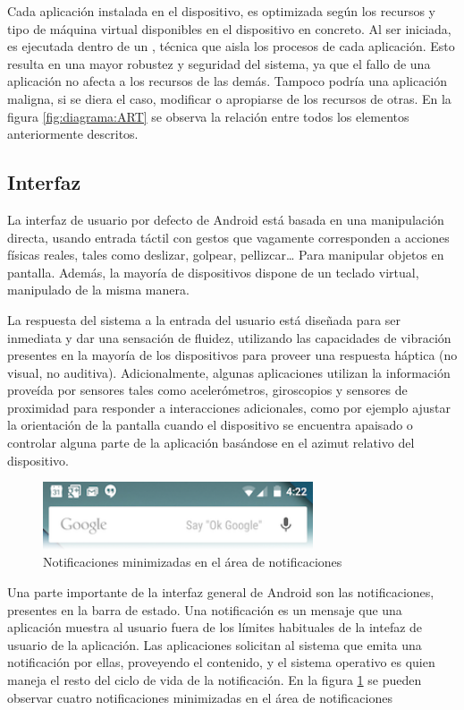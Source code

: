     Cada aplicación instalada en el dispositivo, es optimizada según los recursos y tipo de máquina virtual disponibles en el dispositivo en concreto. Al ser iniciada, es ejecutada dentro de un , técnica que aisla los procesos de cada aplicación. Esto resulta en una mayor robustez y seguridad del sistema, ya que el fallo de una aplicación no afecta a los recursos de las demás. Tampoco podría una aplicación maligna, si se diera el caso, modificar o apropiarse de los recursos de otras. En la figura \ref{fig:diagrama:ART} se observa la relación entre todos los elementos anteriormente descritos.

\subsection{Interfaz}
    La interfaz de usuario por defecto de Android está basada en una manipulación directa, usando entrada táctil con gestos que vagamente corresponden a acciones físicas reales, tales como deslizar, golpear, pellizcar… Para manipular objetos en pantalla. Además, la mayoría de dispositivos dispone de un teclado virtual, manipulado de la misma manera. 

    La respuesta del sistema a la entrada del usuario está diseñada para ser inmediata y dar una sensación de fluidez, utilizando las capacidades de vibración presentes en la mayoría de los dispositivos para proveer una respuesta háptica (no visual, no auditiva). Adicionalmente, algunas aplicaciones utilizan la información proveída por sensores tales como acelerómetros, giroscopios y sensores de proximidad para responder a interacciones adicionales, como por ejemplo ajustar la orientación de la pantalla cuando el dispositivo se encuentra apaisado o controlar alguna parte de la aplicación basándose en el azimut relativo del dispositivo.

\begin{figure}[h] \centering
    \includegraphics[width=8cm]{graphs/notification_area.png} \caption{Notificaciones minimizadas en el área de notificaciones\cite{androiddevguide} }\label{fig:screen:notification}
\end{figure}

    Una parte importante de la interfaz general de Android son las notificaciones, presentes en la barra de estado. Una notificación es un mensaje que una aplicación muestra al usuario fuera de los límites habituales de la intefaz de usuario de la aplicación. Las aplicaciones solicitan al sistema que emita una notificación por ellas, proveyendo el contenido, y el sistema operativo es quien maneja el resto del ciclo de vida de la notificación. En la figura \ref{fig:screen:notification} se pueden observar cuatro notificaciones minimizadas en el área de notificaciones

